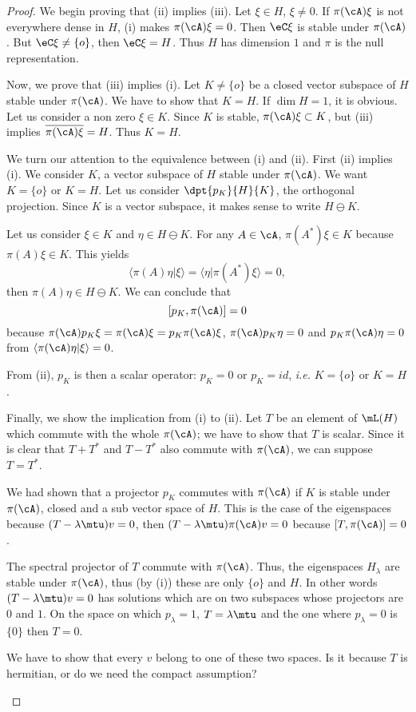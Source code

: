 \begin{proof}
We begin proving that (ii) implies (iii). Let $\xi\in H$, $\xi\neq 0$.
If $\pi(\cA)\xi$ is not everywhere dense in $H$, (i) makes
$\pi(\cA)\xi=0$. Then $\eC\xi$ is stable under $\pi(\cA)$. But
$\eC\xi\neq\{o\}$, then $\eC\xi=H$. Thus $H$ has dimension $1$ and $\pi$
is the null representation.

Now, we prove that (iii) implies (i). Let $K\neq\{o\}$ be a closed
vector
subspace of $H$ stable under $\pi(\cA)$. We have to show that $K=H$. If
$\dim H=1$, it is obvious. Let us consider a non zero  $\xi\in K$. Since
$K$ is stable, $\pi(\cA)\xi\subset K$, but (iii) implies
 $\overline{ \pi(\cA)\xi }=H$. Thus $K=H$.

We turn our attention to the equivalence between (i) and (ii). First
(ii) implies (i). We consider $K$, a vector subspace of $H$ stable under
$\pi(\cA)$. We want $K=\{o\}$ or $K=H$. Let us consider
$\dpt{p_K}{H}{K}$, the orthogonal projection. Since $K$ is a vector
subspace, it makes sense to write $H\ominus K$.

Let us consider $\xi\in K$ and $\eta\in H\ominus K$. For any $A\in\cA$,
$\pi(A^*)\xi\in K$ because $\pi(A)\xi\in K$. This yields
\[
   \langle \pi(A)\eta|\xi\rangle =\langle\eta|\pi(A^*)\xi\rangle=0,
\]
then $\pi(A)\eta\in H\ominus K$. We can conclude that
\[
   [p_K,\pi(\cA)]=0
\]
because $\pi(\cA)p_K\xi=\pi(\cA)\xi=p_K\pi(\cA)\xi$, $\pi(\cA)p_K\eta=0$  and $p_K\pi(\cA)\eta=0$ from $\langle \pi(\cA)\eta|\xi\rangle =0$.

From (ii), $p_K$ is then a scalar operator: $p_K=0$ or $p_K=id$, \emph{i.e.} $K=\{o\}$ or $K=H$.

Finally, we show the implication from (i) to (ii). Let $T$ be an element of $\mL(H)$ which commute with the whole $\pi(\cA)$; we have to show that $T$ is scalar. Since it is clear that $T+T^*$ and $T-T^*$ also commute with $\pi(\cA)$, we can suppose $T=T^*$.

We had shown that a projector $p_K$ commutes with $\pi(\cA)$ if $K$ is stable under $\pi(\cA)$, closed and a sub vector space of $H$. This is the case of the eigenspaces because $(T-\lambda\mtu)v=0$, then $(T-\lambda\mtu)\pi(\cA)v=0$ because $[T,\pi(\cA)]=0$.

The spectral projector of $T$ commute with $\pi(\cA)$. Thus, the eigenspaces $H_{\lambda}$ are stable under $\pi(\cA)$, thus (by (i)) these are only $\{o\}$ and $H$. In other words $(T-\lambda\mtu)v=0$ has solutions which are on two subspaces whose projectors are $0$ and $1$. On the space on which $p_{\lambda}=1$, $T=\lambda\mtu$ and the one where $p_{\lambda}=0$ is $\{0\}$ then $T=0$.

\begin{probleme}
    We have to show that every $v$ belong to one of these two spaces. Is it because $T$ is hermitian, or do we need the compact assumption?
\end{probleme}

\end{proof}

